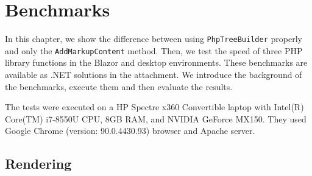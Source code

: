 \chapter{Benchmarks}

In this chapter, we show the difference between using \texttt{PhpTreeBuilder} properly and only the \texttt{AddMarkupContent} method.
Then, we test the speed of three PHP library functions in the Blazor and desktop environments.
These benchmarks are available as .NET solutions in the attachment.
We introduce the background of the benchmarks, execute them and then evaluate the results.
\par
The tests were executed on a HP Spectre x360 Convertible laptop with Intel(R) Core(TM) i7-8550U CPU, 8GB RAM, and NVIDIA GeForce MX150.
They used Google Chrome (version: 90.0.4430.93) browser and Apache server.

\section{Rendering}

